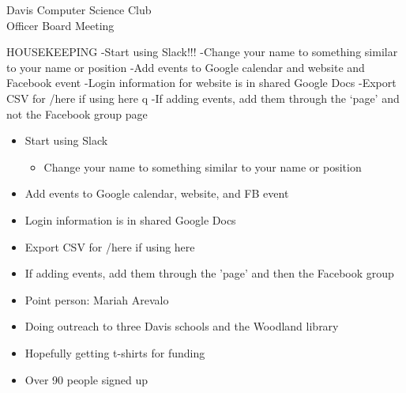 \documentclass{article}
\begin{document}
\begin{Minutes}{Davis Computer Science Club\\Officer Board Meeting}





\maketitle
HOUSEKEEPING
-Start using Slack!!!
-Change your name to something similar to your name or position
-Add events to Google calendar and website and Facebook event
-Login information for website is in shared Google Docs
-Export CSV for /here if using here q
-If adding events, add them through the ‘page’ and not the Facebook group page


\begin{itemize}
\item Start using Slack
    \begin{itemize}
    \item Change your name to something similar to your name or position
    \end {itemize}
\item Add events to Google calendar, website, and FB event
\item Login information is in shared Google Docs
\item Export CSV for /here if using here
\item If adding events, add them through the 'page' and then the Facebook group
\end {itemize}

\begin {itemize}
\item Point person: Mariah Arevalo
\item Doing outreach to three Davis schools and the Woodland library
\item Hopefully getting t-shirts for funding
\item Over 90 people signed up
\end {itemize}


\end{Minutes}
\end{document}
